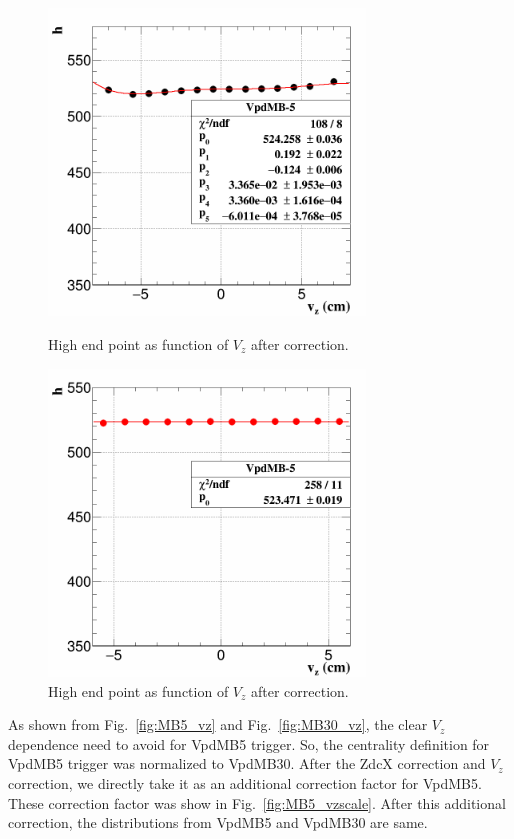 \begin{figure}[htbp]
\begin{minipage}[htbp]{0.52\linewidth}
\centering
\includegraphics[width=0.75\textwidth]{figure/Run14_D0HFT/MB5_Vzcor2.png}
\caption{High end point as function of $V_{z}$ after correction.\label{fig:MB5_vz2}}
\end{minipage}
\hfill
\begin{minipage}[htbp]{0.52\linewidth}
\centering
\includegraphics[width=0.75\textwidth]{figure/Run14_D0HFT/MB5_Vzcor3.png} 
\caption{High end point  as function of $V_{z}$ after correction.\label{fig:MB5_vz3}}
\end{minipage}
\end{figure}

As shown from Fig.~\ref{fig:MB5_vz} and Fig.~\ref{fig:MB30_vz}, the clear $V_{z}$ dependence need to avoid for VpdMB5 trigger. So, the centrality definition for VpdMB5 trigger was normalized to VpdMB30. After the ZdcX correction and $V_{z}$ correction, we directly take it as an additional correction factor for VpdMB5. These correction factor was show in Fig.~\ref{fig:MB5_vzscale}. After this additional correction, the distributions from VpdMB5 and VpdMB30 are same.

